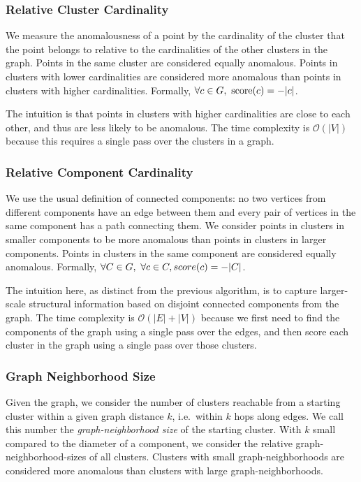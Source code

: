\subsubsection{Relative Cluster Cardinality}
\label{subsubsec:methods:individual-algorithms:relative-cluster-cardinality}
We measure the anomalousness of a point by the cardinality of the cluster that the point belongs to relative to the cardinalities of the other clusters in the graph.
Points in the same cluster are considered equally anomalous.
Points in clusters with lower cardinalities are considered more anomalous than points in clusters with higher cardinalities.
Formally, $\forall c \in G, \ \score(c) = -|c|$.

The intuition is that points in clusters with higher cardinalities are close to each other, and thus are less likely to be anomalous.
The time complexity is $\mathcal{O}(|V|)$ because this requires a single pass over the clusters in a graph.


\subsubsection{Relative Component Cardinality}
\label{subsubsec:methods:individual-algorithms:relative-component-cardinality}
We use the usual definition of connected components:
no two vertices from different components have an edge between them and every pair of vertices in the same component has a path connecting them.
We consider points in clusters in smaller components to be more anomalous than points in clusters in larger components.
Points in clusters in the same component are considered equally anomalous.
Formally, $\forall C \in G, \ \forall c \in C,  \\score(c) = -|C|$.

The intuition here, as distinct from the previous algorithm, is to capture larger-scale structural information based on disjoint connected components from the graph.
The time complexity is $\mathcal{O}(|E| + |V|)$ because we first need to find the components of the graph using a single pass over the edges, and then score each cluster in the graph using a single pass over those clusters.


\subsubsection{Graph Neighborhood Size}
\label{subsubsec:methods:individual-algorithms:graph-neighborhood-size}
Given the graph, we consider the number of clusters reachable from a starting cluster within a given graph distance $k$, i.e.\ within $k$ hops along edges.
We call this number the \textit{graph-neighborhood size} of the starting cluster.
With $k$ small compared to the diameter of a component, we consider the relative graph-neighborhood-sizes of all clusters.
Clusters with small graph-neighborhoods are considered more anomalous than clusters with large graph-neighborhoods.

